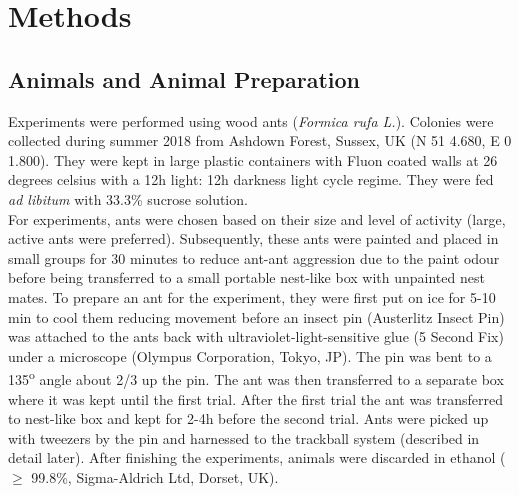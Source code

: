 \chapter{Methods}
\label{chap:methods}

\hspace{0pt}
\vfill
\section{Animals and Animal Preparation}
Experiments were performed using wood ants (\textit{Formica rufa L.}). Colonies were collected during summer 2018 from Ashdown Forest, Sussex, UK (N 51 4.680, E 0 1.800). They were kept in large plastic containers with Fluon coated walls at 26 degrees celsius with a 12h light: 12h darkness light cycle regime. They were fed \textit{ad libitum} with 33.3\% sucrose solution. \\
For experiments, ants were chosen based on their size and level of activity (large, active ants were preferred). Subsequently, these ants were painted and placed in small groups for 30 minutes to reduce ant-ant aggression due to the paint odour before being transferred to a small portable nest-like box with unpainted nest mates. To prepare an ant for the experiment, they were first put on ice for 5-10 min to cool them reducing movement before an insect pin (Austerlitz Insect Pin) was attached to the ants back with ultraviolet-light-sensitive glue (5 Second Fix) under a microscope (Olympus Corporation, Tokyo, JP). The pin was bent to a 135\textsuperscript{o} angle about 2/3 up the pin. The ant was then transferred to a separate box where it was kept until the first trial. After the first trial the ant was transferred to nest-like box and kept for 2-4h before the second trial. Ants were picked up with tweezers by the pin and harnessed to the trackball system (described in detail later). After finishing the experiments, animals were discarded in ethanol ($\geq$ 99.8\%, Sigma-Aldrich Ltd, Dorset, UK).
\vfill
\hspace{0pt}
